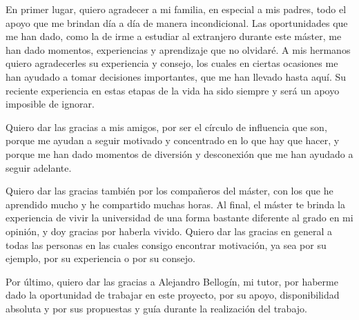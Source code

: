 En primer lugar, quiero agradecer a mi familia, en especial a mis padres, todo el apoyo que me brindan 
día a día de manera incondicional. Las oportunidades que me han dado, como la de irme a estudiar al extranjero durante este máster,
me han dado momentos, experiencias y aprendizaje que no olvidaré. A mis hermanos quiero agradecerles su experiencia y consejo, los cuales en 
ciertas ocasiones me han ayudado a tomar decisiones importantes, que me han llevado hasta aquí. Su reciente experiencia en estas etapas de la vida ha sido siempre y será un apoyo
imposible de ignorar.

Quiero dar las gracias a mis amigos, por ser el círculo de influencia que son, porque 
me ayudan a seguir motivado y concentrado en lo que hay que hacer, y porque me han dado momentos de diversión y desconexión que me han ayudado a seguir adelante.

Quiero dar las gracias también por los compañeros del máster, con los que he aprendido mucho y he compartido muchas horas. Al final,
el máster te brinda la experiencia de vivir la universidad de una forma bastante diferente al grado en mi opinión, y doy gracias por haberla vivido.
Quiero dar las gracias en general a todas las personas en las cuales consigo encontrar motivación, ya sea por su ejemplo, por su experiencia o por su consejo.

Por último, quiero dar las gracias a Alejandro Bellogín, mi tutor, por haberme dado la oportunidad de trabajar en este proyecto, 
por su apoyo, disponibilidad absoluta y por sus propuestas y guía durante la realización del trabajo.